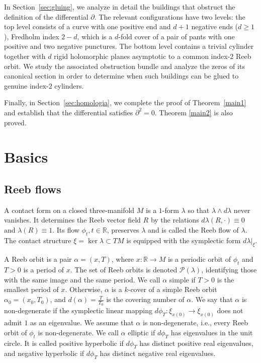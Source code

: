\documentclass{amsart}
\newcommand{\R}{\mathbb{R}}
\begin{document}
In Section~\ref{sec:gluing}, we analyze in detail the buildings that
obstruct the definition of the differential $\partial$. The relevant
configurations have two levels: the top level consists of a curve with
one positive end and $d+1$ negative ends ($d\geq 1$), Fredholm index
$2-d$, which is a $d$-fold cover of a pair of pants with one positive
and two negative punctures. The bottom level contains a trivial cylinder
together with $d$ rigid holomorphic planes asymptotic to a common
index-$2$ Reeb orbit. We study the associated obstruction bundle and
analyze the zeros of its canonical section in order to determine when
such buildings can be glued to genuine index-$2$ cylinders.



Finally, in Section~\ref{sec:homologia}, we complete the proof of
Theorem~\ref{main1} and establish that the differential satisfies
$\partial^2=0$. Theorem \ref{main2} is also proved.





\section{Basics}
\label{sec:basics}

\subsection{Reeb flows} A contact form on a closed three-manifold $M$ is a $1$-form $\lambda$ so that $\lambda \wedge d\lambda$ never vanishes. It determines  the Reeb vector field $R$  by the relations
$d\lambda(R, \cdot) \equiv 0$ and $\lambda(R) \equiv 1.$ Its flow $\phi_t,t\in \R$, preserves $\lambda$ and is called the Reeb flow of $\lambda$.
The contact structure $\xi=\ker \lambda\subset TM$ is  equipped with the symplectic form $d\lambda|_\xi$. 

A Reeb orbit is a pair $\alpha=(x,T)$, where $x:\R \to M$ is a periodic orbit of $\phi_t$ and $T>0$ is a period of $x$. The set of Reeb orbits is denoted $\mathcal{P}(\lambda)$,  identifying those with the same image and the same period. We call $\alpha$ simple if $T>0$ is the smallest period of $x$. Otherwise,  $\alpha$ is a $k$-cover of a simple Reeb orbit $\alpha_0=(x_0,T_0)$, and  $d(\alpha)=\frac{T}{T_0}$ is the covering number of $\alpha$. We say that $\alpha$ is non-degenerate if the symplectic linear mapping
 $
  d\phi_T:\xi_{x(0)} \to \xi_{x(0)}$ does not admit $1$  as an eigenvalue.
 We assume that $\alpha$ is non-degenerate, i.e., every Reeb orbit of $\phi_t$ is non-degenerate. We call $\alpha$ elliptic if $d\phi_T$ has eigenvalues in the unit circle. It is called positive hyperbolic if $d\phi_T$ has distinct positive real eigenvalues, and negative hyperbolic if $d\phi_T$ has distinct negative real eigenvalues.
\end{document}
